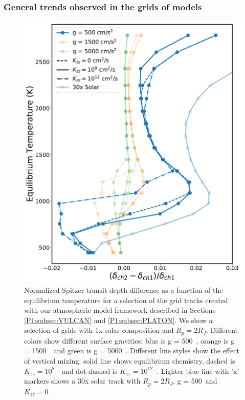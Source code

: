 \subsubsection{General trends observed in the grids of models}

\begin{figure}
    \centering
    \includegraphics[width=\linewidth]{gridtracks.pdf}
    \caption{Normalized Spitzer transit depth difference as a function of the equilibrium temperature for a selection of the grid tracks created with our atmospheric model framework described in Sections \ref{P1:subsec:VULCAN} and \ref{P1:subsec:PLATON}. We show a selection of grids with 1x solar composition and $R_p = 2R_J$. Different colors show different surface gravities: blue is g = 500~\cmss, orange is g = 1500~\cmss~and green is g = 5000~\cmss. Different line styles show the effect of vertical mixing: solid line shows equilibrium chemistry, dashed is $K_{zz}=10^8$~\cmcms~and dot-dashed is $K_{zz}=10^{12}$~\cmcms. Lighter blue line with 'x' markers shows a 30x solar track with $R_p = 2R_J$, g = 500~\cmss and $K_{zz}=0$~\cmcms.}
    \label{P1:fig:tracks}
\end{figure}

